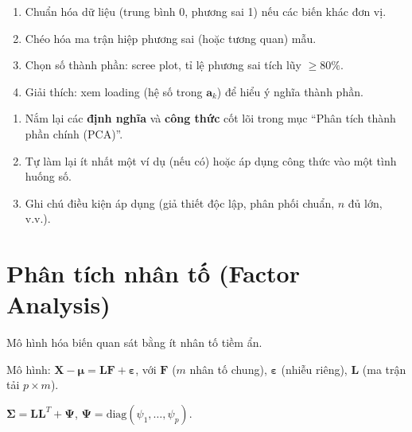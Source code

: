 \documentclass[12pt,a4paper]{article}
\begin{document}
\begin{phuongphap}[title={Thực hành PCA}]
  \begin{enumerate}
    \item Chuẩn hóa dữ liệu (trung bình 0, phương sai 1) nếu các biến khác đơn vị.
    \item Chéo hóa ma trận hiệp phương sai (hoặc tương quan) mẫu.
    \item Chọn số thành phần: scree plot, tỉ lệ phương sai tích lũy $\ge 80\%$.
    \item Giải thích: xem loading (hệ số trong $\mathbf{a}_k$) để hiểu ý nghĩa thành phần.
  \end{enumerate}
\end{phuongphap}


\begin{tongket}[title={Tổng kết: Phân tích thành phần chính (PCA)}]
\begin{enumerate}
  \item Nắm lại các \textbf{định nghĩa} và \textbf{công thức} cốt lõi trong mục ``Phân tích thành phần chính (PCA)''.
  \item Tự làm lại ít nhất một ví dụ (nếu có) hoặc áp dụng công thức vào một tình huống số.
  \item Ghi chú điều kiện áp dụng (giả thiết độc lập, phân phối chuẩn, $n$ đủ lớn, v.v.).
\end{enumerate}
\end{tongket}

\section{Phân tích nhân tố (Factor Analysis)}

\begin{dongco}[title={Động cơ --- Phân tích nhân tố (Factor Analysis)}]
Mô hình hóa biến quan sát bằng ít nhân tố tiềm ẩn.
\end{dongco}

\begin{dinhnghia}
  Mô hình: $\mathbf{X} - \boldsymbol{\mu} = \mathbf{L}\mathbf{F} + \boldsymbol{\varepsilon}$, với $\mathbf{F}$ ($m$ nhân tố chung), $\boldsymbol{\varepsilon}$ (nhiễu riêng), $\mathbf{L}$ (ma trận tải $p \times m$).

  $\boldsymbol{\Sigma} = \mathbf{L}\mathbf{L}^T + \boldsymbol{\Psi}$, $\boldsymbol{\Psi} = \text{diag}(\psi_1, \ldots, \psi_p)$.
\end{dinhnghia}
\end{document}
